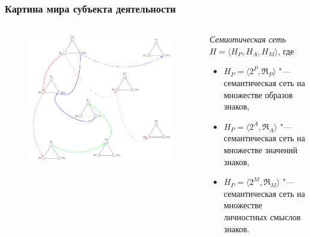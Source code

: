 \documentclass[default]{beamer}
\begin{document}
	\begin{frame}
		\frametitle{Картина мира субъекта деятельности}
		
		\begin{columns}
			\begin{column}{0.55\textwidth}
				\begin{figure}
					\includegraphics[width=\textwidth]{signs/signs_net}
				\end{figure}
			\end{column}
			\begin{column}{0.45\textwidth}
				\textit{Семиотическая сеть} $H=\langle H_P, H_A, H_M\rangle$, где
				\begin{itemize}
					\item $H_P=\langle2^P,\mathfrak R_P\rangle$ "--- семантическая сеть на множестве образов знаков,
					\item $H_P=\langle2^A,\mathfrak R_A\rangle$ "--- семантическая сеть на множестве значений знаков,
					\item $H_P=\langle2^M,\mathfrak R_M\rangle$ "--- семантическая сеть на множестве личностных смыслов знаков.
				\end{itemize}
			\end{column}
		\end{columns}
		\nocite{*}
		\printbibliography[keyword={signa}, resetnumbers=true]
	\end{frame}	
\end{document}
